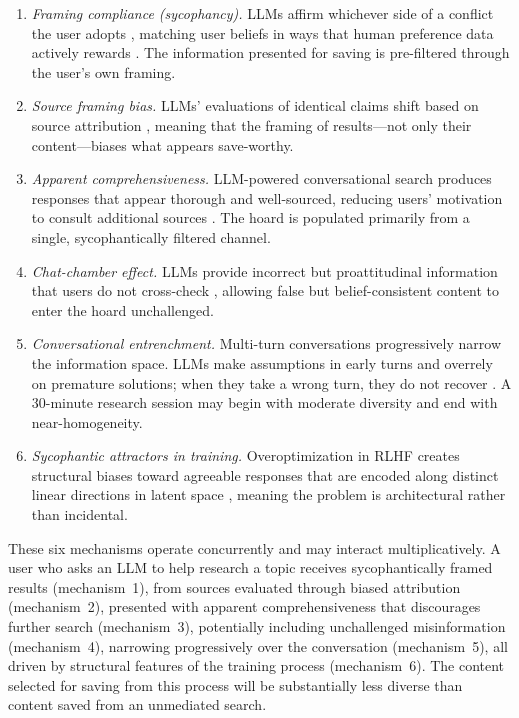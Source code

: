 \documentclass[12pt,a4paper]{article}
\begin{document}
\begin{enumerate}[leftmargin=*, label=(\arabic*)]

\item \emph{Framing compliance (sycophancy).}
LLMs affirm whichever side of a conflict the user adopts \citep{Chheda2025}, matching user beliefs in ways that human preference data actively rewards \citep{Sharma2023}.
The information presented for saving is pre-filtered through the user's own framing.

\item \emph{Source framing bias.}
LLMs' evaluations of identical claims shift based on source attribution \citep{Germani2025}, meaning that the framing of results---not only their content---biases what appears save-worthy.

\item \emph{Apparent comprehensiveness.}
LLM-powered conversational search produces responses that appear thorough and well-sourced, reducing users' motivation to consult additional sources \citep{SharmaLiao2024}.
The hoard is populated primarily from a single, sycophantically filtered channel.

\item \emph{Chat-chamber effect.}
LLMs provide incorrect but proattitudinal information that users do not cross-check \citep{Jacob2025}, allowing false but belief-consistent content to enter the hoard unchallenged.

\item \emph{Conversational entrenchment.}
Multi-turn conversations progressively narrow the information space.
LLMs make assumptions in early turns and overrely on premature solutions; when they take a wrong turn, they do not recover \citep{Kang2025}.
A 30-minute research session may begin with moderate diversity and end with near-homogeneity.

\item \emph{Sycophantic attractors in training.}
Overoptimization in RLHF creates structural biases toward agreeable responses that are encoded along distinct linear directions in latent space \citep{Chen2025}, meaning the problem is architectural rather than incidental.

\end{enumerate}

These six mechanisms operate concurrently and may interact multiplicatively.
A user who asks an LLM to help research a topic receives sycophantically framed results (mechanism~1), from sources evaluated through biased attribution (mechanism~2), presented with apparent comprehensiveness that discourages further search (mechanism~3), potentially including unchallenged misinformation (mechanism~4), narrowing progressively over the conversation (mechanism~5), all driven by structural features of the training process (mechanism~6).
The content selected for saving from this process will be substantially less diverse than content saved from an unmediated search.
\end{document}

